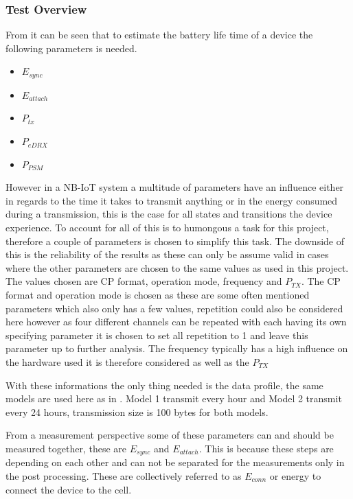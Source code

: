 \subsubsection{Test Overview}
From  it can be seen that to estimate the battery life time of a device the following parameters is needed.
\begin{itemize}
\item $E_{sync}$
\item $E_{attach}$
\item $P_{tx}$
\item $P_{eDRX}$
\item $P_{PSM}$
\end{itemize}

However in a \gls{NB-IoT} system a multitude of parameters have an influence either in regards to the time it takes to transmit anything or in the energy consumed during a transmission, this is the case for all states and transitions the device experience. To account for all of this is to humongous a task for this project, therefore a couple of parameters is chosen to simplify this task. The downside of this is the reliability of the results as these can only be assume valid in cases where the other parameters are chosen to the same values as used in this project. The values chosen are CP format, operation mode, frequency and $P_{TX}$. The CP format and operation mode is chosen as these are some often mentioned parameters which also only has a few values, repetition could also be considered here however as four different channels can be repeated with each having its own specifying parameter it is chosen to set all repetition to 1 and leave this parameter up to further analysis. The frequency typically has a high influence on the hardware used it is therefore considered as well as the $P_{TX}$  

With these informations the only thing needed is the data profile, the same models are used here as in \citep{Power_article}. Model 1 transmit every hour and Model 2 transmit every 24 hours, transmission size is 100 bytes for both models. %

From a measurement perspective some of these parameters can and should be measured together, these are $E_{sync}$ and $E_{attach}$. This is because these steps are depending on each other and can not be separated for the measurements only in the post processing. These are collectively referred to as $E_{conn}$ or energy to connect the device to the cell. 

